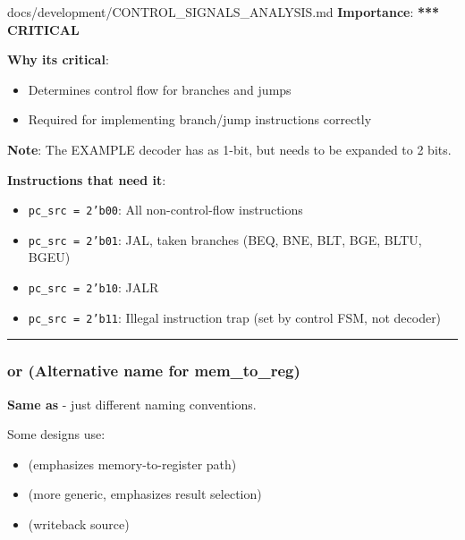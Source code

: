 \begin{relocated}{docs/development/CONTROL_SIGNALS_ANALYSIS.md}
\textbf{Importance}: \textbf{*}\textbf{*}\textbf{*} \textbf{CRITICAL}

\textbf{Why it\textquotesingle s critical}:

\begin{itemize}
\tightlist
\item
  Determines control flow for branches and jumps
\item
  Required for implementing branch/\allowbreak{}jump instructions
  correctly
\end{itemize}

\textbf{Note}: The EXAMPLE decoder has  as 1-bit, but needs
to be expanded to 2 bits.

\textbf{Instructions that need it}:

\begin{itemize}
\tightlist
\item
  \texttt{pc\_\allowbreak{}src\ =\allowbreak{}\ 2'b00}: All
  non-control-flow instructions
\item
  \texttt{pc\_\allowbreak{}src\ =\allowbreak{}\ 2'b01}: JAL, taken
  branches (BEQ, BNE, BLT, BGE, BLTU, BGEU)
\item
  \texttt{pc\_\allowbreak{}src\ =\allowbreak{}\ 2'b10}: JALR
\item
  \texttt{pc\_\allowbreak{}src\ =\allowbreak{}\ 2'b11}: Illegal
  instruction trap (set by control FSM, not decoder)
\end{itemize}

\begin{center}\rule{0.5\linewidth}{0.5pt}\end{center}

\subsubsection{\texorpdfstring{ or 
(Alternative name for
mem\_\allowbreak{}to\_\allowbreak{}reg)}{or  (Alternative name for mem\_to\_reg)}}\label{tm:flow:control-signals-analysis:4-result-src-or-wb-src-alternative-name-for-mem-to-reg}

\textbf{Same as } - just different naming conventions.

Some designs use:

\begin{itemize}
\tightlist
\item
   (emphasizes memory-to-register path)
\item
   (more generic, emphasizes result selection)
\item
   (writeback source)
\end{itemize}


\end{relocated}
